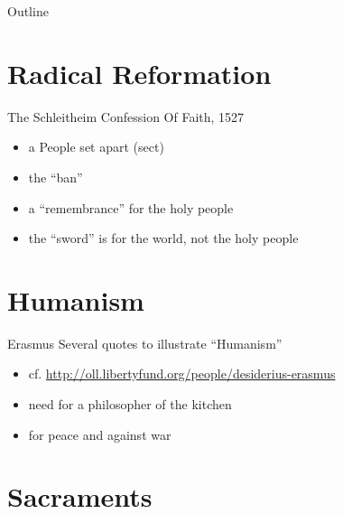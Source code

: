 

\maketitle
\begin{frame}{Outline}
\setcounter{tocdepth}{1}
\tableofcontents
\end{frame}

\section{Radical Reformation}
\label{sec-1}
\begin{frame}[label=sec-1-1]{The Schleitheim Confession Of Faith, 1527}
\begin{itemize}
\item a People set apart (sect)
\item the ``ban''
\item a ``remembrance'' for the holy people
\item the ``sword'' is for the world, not the holy people
\end{itemize}
\end{frame}

\section{Humanism}
\label{sec-2}
\begin{frame}[label=sec-2-1]{Erasmus}
Several quotes to illustrate ``Humanism''

\begin{itemize}
\item cf. \url{http://oll.libertyfund.org/people/desiderius-erasmus}
\item need for a philosopher of the kitchen
\item for peace and against war
\end{itemize}
\end{frame}

\section{Sacraments}
\label{sec-3}

